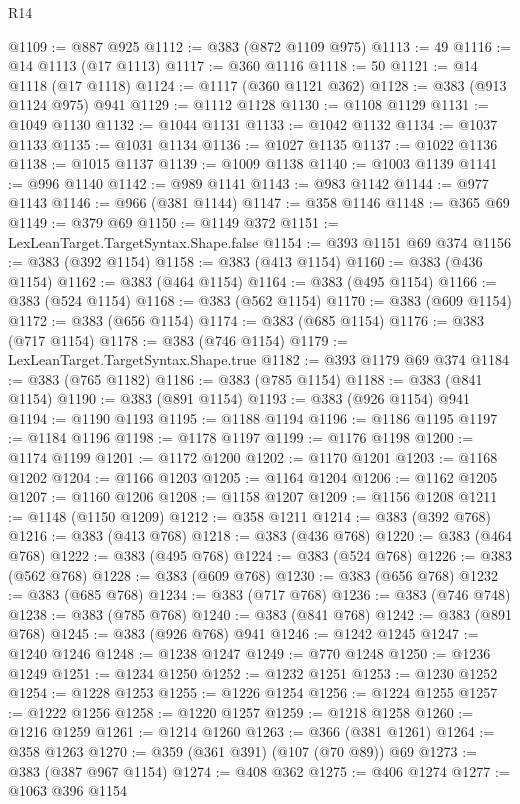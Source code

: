 \begin{lexlean}{R14}
\begin{coremodule}
@1109 := @887 @925
@1112 := @383 (@872 @1109 @975)
@1113 := 49
@1116 := @14 @1113 (@17 @1113)
@1117 := @360 @1116
@1118 := 50
@1121 := @14 @1118 (@17 @1118)
@1124 := @1117 (@360 @1121 @362)
@1128 := @383 (@913 @1124 @975) @941
@1129 := @1112 @1128
@1130 := @1108 @1129
@1131 := @1049 @1130
@1132 := @1044 @1131
@1133 := @1042 @1132
@1134 := @1037 @1133
@1135 := @1031 @1134
@1136 := @1027 @1135
@1137 := @1022 @1136
@1138 := @1015 @1137
@1139 := @1009 @1138
@1140 := @1003 @1139
@1141 := @996 @1140
@1142 := @989 @1141
@1143 := @983 @1142
@1144 := @977 @1143
@1146 := @966 (@381 @1144)
@1147 := @358 @1146
@1148 := @365 @69
@1149 := @379 @69
@1150 := @1149 @372
@1151 := LexLeanTarget.TargetSyntax.Shape.false
@1154 := @393 @1151 @69 @374
@1156 := @383 (@392 @1154)
@1158 := @383 (@413 @1154)
@1160 := @383 (@436 @1154)
@1162 := @383 (@464 @1154)
@1164 := @383 (@495 @1154)
@1166 := @383 (@524 @1154)
@1168 := @383 (@562 @1154)
@1170 := @383 (@609 @1154)
@1172 := @383 (@656 @1154)
@1174 := @383 (@685 @1154)
@1176 := @383 (@717 @1154)
@1178 := @383 (@746 @1154)
@1179 := LexLeanTarget.TargetSyntax.Shape.true
@1182 := @393 @1179 @69 @374
@1184 := @383 (@765 @1182)
@1186 := @383 (@785 @1154)
@1188 := @383 (@841 @1154)
@1190 := @383 (@891 @1154)
@1193 := @383 (@926 @1154) @941
@1194 := @1190 @1193
@1195 := @1188 @1194
@1196 := @1186 @1195
@1197 := @1184 @1196
@1198 := @1178 @1197
@1199 := @1176 @1198
@1200 := @1174 @1199
@1201 := @1172 @1200
@1202 := @1170 @1201
@1203 := @1168 @1202
@1204 := @1166 @1203
@1205 := @1164 @1204
@1206 := @1162 @1205
@1207 := @1160 @1206
@1208 := @1158 @1207
@1209 := @1156 @1208
@1211 := @1148 (@1150 @1209)
@1212 := @358 @1211
@1214 := @383 (@392 @768)
@1216 := @383 (@413 @768)
@1218 := @383 (@436 @768)
@1220 := @383 (@464 @768)
@1222 := @383 (@495 @768)
@1224 := @383 (@524 @768)
@1226 := @383 (@562 @768)
@1228 := @383 (@609 @768)
@1230 := @383 (@656 @768)
@1232 := @383 (@685 @768)
@1234 := @383 (@717 @768)
@1236 := @383 (@746 @748)
@1238 := @383 (@785 @768)
@1240 := @383 (@841 @768)
@1242 := @383 (@891 @768)
@1245 := @383 (@926 @768) @941
@1246 := @1242 @1245
@1247 := @1240 @1246
@1248 := @1238 @1247
@1249 := @770 @1248
@1250 := @1236 @1249
@1251 := @1234 @1250
@1252 := @1232 @1251
@1253 := @1230 @1252
@1254 := @1228 @1253
@1255 := @1226 @1254
@1256 := @1224 @1255
@1257 := @1222 @1256
@1258 := @1220 @1257
@1259 := @1218 @1258
@1260 := @1216 @1259
@1261 := @1214 @1260
@1263 := @366 (@381 @1261)
@1264 := @358 @1263
@1270 := @359 (@361 @391) (@107 (@70 @89)) @69
@1273 := @383 (@387 @967 @1154)
@1274 := @408 @362
@1275 := @406 @1274
@1277 := @1063 @396 @1154

\end{coremodule}
\end{lexlean}

